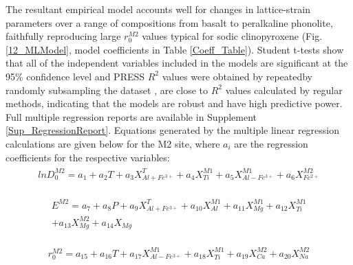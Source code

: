 \documentclass[review,authoryear,12pt]{elsarticle}
\begin{document}
	The resultant empirical model accounts well for changes in lattice-strain parameters over a range of compositions from basalt to peralkaline phonolite, faithfully reproducing large $r_0^{M2}$ values typical for sodic clinopyroxene (Fig. \ref{12_MLModel}, model coefficients in Table \ref{Coeff_Table}). Student t-tests show that all of the independent variables included in the models are significant at the 95\% confidence level and PRESS $R^2$ values were obtained by repeatedby randomly subsampling the dataset \citep{Stevens1996}, are close to $R^2$ values calculated by regular methods, indicating that the models are robust and have high predictive power. Full multiple regression reports are available in Supplement \ref{Sup_RegressionReport}. Equations generated by the multiple linear regression calculations are given below for the M2 site, where $a_i$ are the regression coefficients for the respective variables: \\
	
		\begin{align} %
	\begin{split}
   lnD^{M2}_0 = a_1 + a_2T + a_3X^{T}_{Al + Fe^{3+}} + a_4X^{M1}_{Ti} + a_5X^{M1}_{Al - Fe^{3+}} + a_6X^{M2}_{Fe^{2+}}
   	\end{split}
	\label{D0M2_eqn}
	\end{align}
	
	\begin{align} %
	\begin{split}
	E^{M2} = a_7 + a_8P + a_9X^{T}_{Al + Fe^{3+}} + a_{10}X^{M1}_{Al} + a_{11}X^{M1}_{Mg} + a_{12}X^{M1}_{Ti} \\ + a_{13}X^{M2}_{Mg} + a_{14}X_{Mg}
	\end{split}
	\label{EM2_eqn}
	\end{align}
	
	\begin{align} %
	\begin{split}
	r^{M2}_0 = a_{15} + a_{16}T + a_{17}X^{M1}_{Al - Fe^{3+}} + a_{18}X^{M1}_{Ti} + a_{19}X^{M2}_{Ca} + a_{20}X^{M2}_{Na}
	\end{split}
	\label{r0M2_eqn}
	\end{align}
	   
\end{document}
